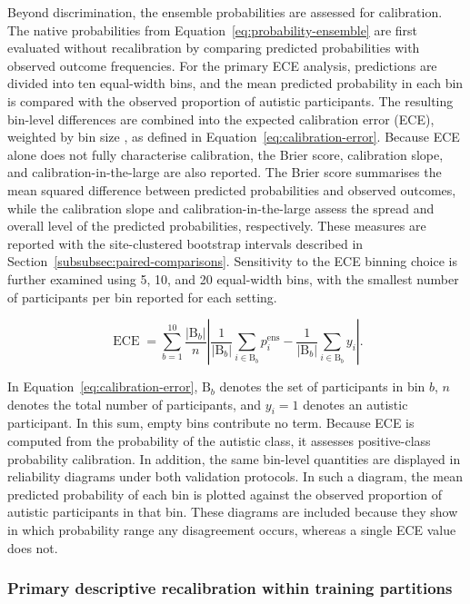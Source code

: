 Beyond discrimination, the ensemble probabilities are assessed for calibration. The native probabilities from Equation~\eqref{eq:probability-ensemble} are first evaluated without recalibration by comparing predicted probabilities with observed outcome frequencies. For the primary ECE analysis, predictions are divided into ten equal-width bins, and the mean predicted probability in each bin is compared with the observed proportion of autistic participants. The resulting bin-level differences are combined into the expected calibration error (ECE), weighted by bin size \citep{Naeinietal2015,Guoetal2017}, as defined in Equation~\eqref{eq:calibration-error}. Because ECE alone does not fully characterise calibration, the Brier score, calibration slope, and calibration-in-the-large are also reported. The Brier score summarises the mean squared difference between predicted probabilities and observed outcomes, while the calibration slope and calibration-in-the-large assess the spread and overall level of the predicted probabilities, respectively. These measures are reported with the site-clustered bootstrap intervals described in Section~\ref{subsubsec:paired-comparisons}. Sensitivity to the ECE binning choice is further examined using 5, 10, and 20 equal-width bins, with the smallest number of participants per bin reported for each setting.

\begin{equation}
\operatorname{ECE}
=
\sum_{b=1}^{10}
\frac{|\mathrm{B}_b|}{n}
\left|
\frac{1}{|\mathrm{B}_b|}
\sum_{i\in\mathrm{B}_b}p_i^{\mathrm{ens}}
-
\frac{1}{|\mathrm{B}_b|}
\sum_{i\in\mathrm{B}_b}y_i
\right|.
\label{eq:calibration-error}
\end{equation}

In Equation~\eqref{eq:calibration-error}, $\mathrm{B}_b$ denotes the set of participants in bin $b$,
$n$ denotes the total number of participants, and $y_i=1$ denotes an autistic participant.
In this sum, empty bins contribute no term. Because ECE is computed from the probability of
the autistic class, it assesses positive-class probability calibration. In addition, the
same bin-level quantities are displayed in reliability diagrams under both validation
protocols. In such a diagram, the mean predicted probability of each bin is plotted against
the observed proportion of autistic participants in that bin. These diagrams are included
because they show in which probability range any disagreement occurs, whereas a single ECE
value does not.

\subsubsection{Primary descriptive recalibration within training partitions}
\label{subsubsec:recalibration}

